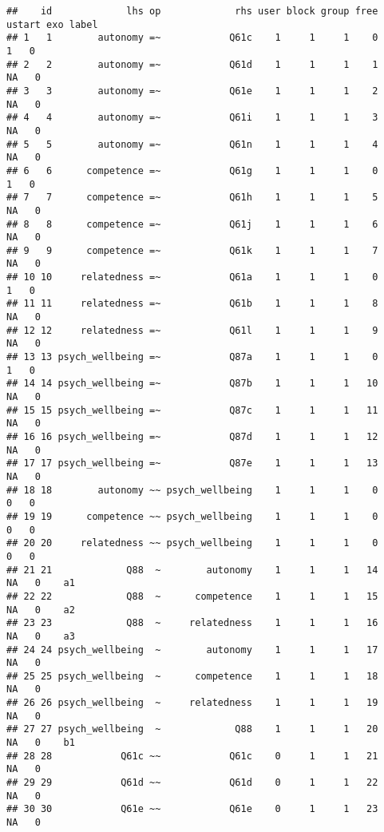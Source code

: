\documentclass[
]{article}
\begin{document}
\begin{verbatim}
##    id             lhs op             rhs user block group free ustart exo label
## 1   1        autonomy =~            Q61c    1     1     1    0      1   0      
## 2   2        autonomy =~            Q61d    1     1     1    1     NA   0      
## 3   3        autonomy =~            Q61e    1     1     1    2     NA   0      
## 4   4        autonomy =~            Q61i    1     1     1    3     NA   0      
## 5   5        autonomy =~            Q61n    1     1     1    4     NA   0      
## 6   6      competence =~            Q61g    1     1     1    0      1   0      
## 7   7      competence =~            Q61h    1     1     1    5     NA   0      
## 8   8      competence =~            Q61j    1     1     1    6     NA   0      
## 9   9      competence =~            Q61k    1     1     1    7     NA   0      
## 10 10     relatedness =~            Q61a    1     1     1    0      1   0      
## 11 11     relatedness =~            Q61b    1     1     1    8     NA   0      
## 12 12     relatedness =~            Q61l    1     1     1    9     NA   0      
## 13 13 psych_wellbeing =~            Q87a    1     1     1    0      1   0      
## 14 14 psych_wellbeing =~            Q87b    1     1     1   10     NA   0      
## 15 15 psych_wellbeing =~            Q87c    1     1     1   11     NA   0      
## 16 16 psych_wellbeing =~            Q87d    1     1     1   12     NA   0      
## 17 17 psych_wellbeing =~            Q87e    1     1     1   13     NA   0      
## 18 18        autonomy ~~ psych_wellbeing    1     1     1    0      0   0      
## 19 19      competence ~~ psych_wellbeing    1     1     1    0      0   0      
## 20 20     relatedness ~~ psych_wellbeing    1     1     1    0      0   0      
## 21 21             Q88  ~        autonomy    1     1     1   14     NA   0    a1
## 22 22             Q88  ~      competence    1     1     1   15     NA   0    a2
## 23 23             Q88  ~     relatedness    1     1     1   16     NA   0    a3
## 24 24 psych_wellbeing  ~        autonomy    1     1     1   17     NA   0      
## 25 25 psych_wellbeing  ~      competence    1     1     1   18     NA   0      
## 26 26 psych_wellbeing  ~     relatedness    1     1     1   19     NA   0      
## 27 27 psych_wellbeing  ~             Q88    1     1     1   20     NA   0    b1
## 28 28            Q61c ~~            Q61c    0     1     1   21     NA   0      
## 29 29            Q61d ~~            Q61d    0     1     1   22     NA   0      
## 30 30            Q61e ~~            Q61e    0     1     1   23     NA   0      

\end{verbatim}
\end{document}
